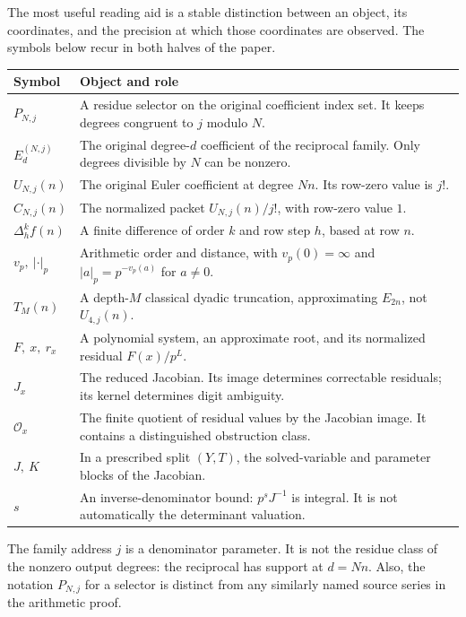 The most useful reading aid is a stable distinction between an object, its coordinates, and the precision at which those coordinates are observed. The symbols below recur in both halves of the paper.
\par
\begin{tabularx}{\linewidth}{@{}lY@{}}\toprule
Symbol & Object and role\\\midrule
$P_{N,j}$ & A residue selector on the original coefficient index set. It keeps degrees congruent to $j$ modulo $N$.\\
$E_d^{(N,j)}$ & The original degree-$d$ coefficient of the reciprocal family. Only degrees divisible by $N$ can be nonzero.\\
$U_{N,j}(n)$ & The original Euler coefficient at degree $Nn$. Its row-zero value is $j!$.\\
$C_{N,j}(n)$ & The normalized packet $U_{N,j}(n)/j!$, with row-zero value $1$.\\
$\Delta_h^k f(n)$ & A finite difference of order $k$ and row step $h$, based at row $n$.\\
$v_p,\ |\cdot|_p$ & Arithmetic order and distance, with $v_p(0)=\infty$ and $|a|_p=p^{-v_p(a)}$ for $a\ne0$.\\
$T_M(n)$ & A depth-$M$ classical dyadic truncation, approximating $E_{2n}$, not $U_{4,j}(n)$.\\
$F,\ x,\ r_x$ & A polynomial system, an approximate root, and its normalized residual $F(x)/p^L$.\\
$J_x$ & The reduced Jacobian. Its image determines correctable residuals; its kernel determines digit ambiguity.\\
$\mathcal O_x$ & The finite quotient of residual values by the Jacobian image. It contains a distinguished obstruction class.\\
$J,\ K$ & In a prescribed split $(Y,T)$, the solved-variable and parameter blocks of the Jacobian.\\
$s$ & An inverse-denominator bound: $p^sJ^{-1}$ is integral. It is not automatically the determinant valuation.\\\bottomrule
\end{tabularx}
\par
{}
The family address $j$ is a denominator parameter. It is not the residue class of the nonzero output degrees: the reciprocal has support at $d=Nn$. Also, the notation $P_{N,j}$ for a selector is distinct from any similarly named source series in the arithmetic proof.

